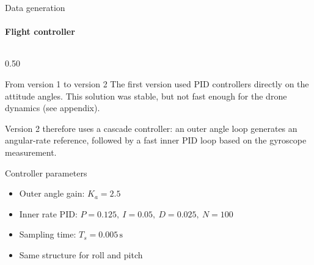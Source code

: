 \begin{frame}{Data generation}
    \framesubtitle{Flight controller}
    \begin{columns}[T,onlytextwidth]
        \begin{column}{0.50\textwidth}
            \begin{block}{From version 1 to version 2}
                The first version used PID controllers directly on the
                attitude angles. This solution was stable, but not fast
                enough for the drone dynamics (see appendix).

                Version 2 therefore uses a cascade controller: an outer
                angle loop generates an angular-rate reference, followed by
                a fast inner PID loop based on the gyroscope measurement.
            \end{block}

            \begin{block}{Controller parameters}
                \begin{itemize}
                    \item Outer angle gain: $K_a=2.5$
                    \item Inner rate PID:
                    $P=0.125,\ I=0.05,\ D=0.025,\ N=100$
                    \item Sampling time: $T_s=0.005\,\mathrm{s}$
                    \item Same structure for roll and pitch
                \end{itemize}
            \end{block}
        \end{column}


\end{columns}
\end{frame}
